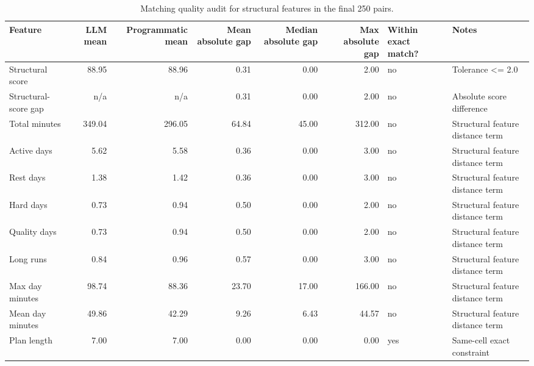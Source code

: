 \begin{table}[t]
\centering
\scriptsize
\setlength{\tabcolsep}{3.2pt}
\begin{tabular}{lrrrrrll}
\toprule
Feature & LLM mean & Programmatic mean & Mean absolute gap & Median absolute gap & Max absolute gap & Within exact match? & Notes \\
\midrule
Structural score & 88.95 & 88.96 & 0.31 & 0.00 & 2.00 & no & Tolerance <= 2.0 \\
Structural-score gap & n/a & n/a & 0.31 & 0.00 & 2.00 & no & Absolute score difference \\
Total minutes & 349.04 & 296.05 & 64.84 & 45.00 & 312.00 & no & Structural feature distance term \\
Active days & 5.62 & 5.58 & 0.36 & 0.00 & 3.00 & no & Structural feature distance term \\
Rest days & 1.38 & 1.42 & 0.36 & 0.00 & 3.00 & no & Structural feature distance term \\
Hard days & 0.73 & 0.94 & 0.50 & 0.00 & 2.00 & no & Structural feature distance term \\
Quality days & 0.73 & 0.94 & 0.50 & 0.00 & 2.00 & no & Structural feature distance term \\
Long runs & 0.84 & 0.96 & 0.57 & 0.00 & 3.00 & no & Structural feature distance term \\
Max day minutes & 98.74 & 88.36 & 23.70 & 17.00 & 166.00 & no & Structural feature distance term \\
Mean day minutes & 49.86 & 42.29 & 9.26 & 6.43 & 44.57 & no & Structural feature distance term \\
Plan length & 7.00 & 7.00 & 0.00 & 0.00 & 0.00 & yes & Same-cell exact constraint \\
\bottomrule
\end{tabular}
\caption{Matching quality audit for structural features in the final 250 pairs.}
\label{tab:matching-quality}
\end{table}

